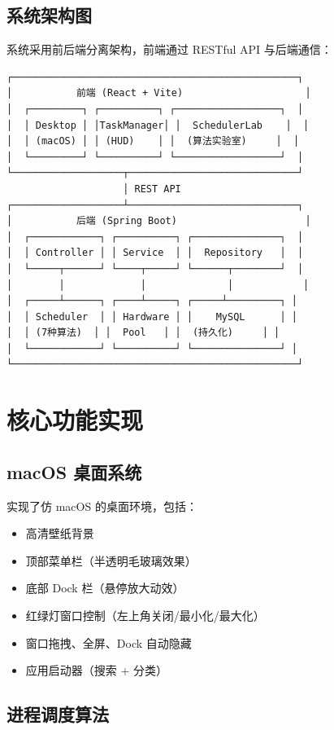 \documentclass[12pt,a4paper]{article}
\begin{document}
\subsection{系统架构图}
系统采用前后端分离架构，前端通过 RESTful API 与后端通信：

\begin{verbatim}
┌─────────────────────────────────────────────────┐
│           前端 (React + Vite)                     │
│  ┌─────────┐ ┌──────────┐ ┌──────────────────┐  │
│  │ Desktop │ │TaskManager│ │  SchedulerLab    │  │
│  │ (macOS) │ │ (HUD)    │ │  (算法实验室)     │  │
│  └─────────┘ └──────────┘ └──────────────────┘  │
└───────────────────┬─────────────────────────────┘
                    │ REST API
┌───────────────────┴─────────────────────────────┐
│           后端 (Spring Boot)                      │
│  ┌────────────┐ ┌──────────┐ ┌───────────────┐  │
│  │ Controller │ │ Service  │ │  Repository   │  │
│  └─────┬──────┘ └────┬─────┘ └──────┬────────┘  │
│        │             │              │            │
│  ┌─────┴──────┐ ┌────┴─────┐ ┌─────┴─────────┐ │
│  │ Scheduler  │ │ Hardware │ │    MySQL      │ │
│  │ (7种算法)  │ │  Pool   │ │  (持久化)     │ │
│  └────────────┘ └──────────┘ └───────────────┘ │
└─────────────────────────────────────────────────┘
\end{verbatim}

\section{核心功能实现}

\subsection{macOS 桌面系统}

实现了仿 macOS 的桌面环境，包括：

\begin{itemize}
    \item 高清壁纸背景
    \item 顶部菜单栏（半透明毛玻璃效果）
    \item 底部 Dock 栏（悬停放大动效）
    \item 红绿灯窗口控制（左上角关闭/最小化/最大化）
    \item 窗口拖拽、全屏、Dock 自动隐藏
    \item 应用启动器（搜索 + 分类）
\end{itemize}

\subsection{进程调度算法}
\end{document}
